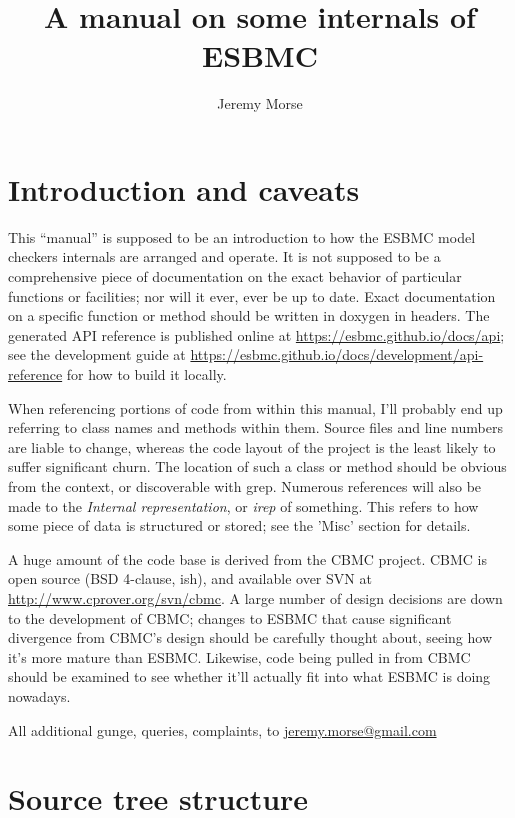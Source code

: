 \documentclass{article}
\newcommand{\subtitle}[1]{%
  \posttitle{%
    \par\end{center}
    \begin{center}\large#1\end{center}
    \vskip0.5em}%
}
\begin{document}
\author{Jeremy Morse}
\title{A manual on some internals of ESBMC}
\subtitle{Caveat lector}
\maketitle
\tableofcontents
\section{Introduction and caveats}

This ``manual'' is supposed to be an introduction to how the ESBMC model
checkers internals are arranged and operate. It is not supposed to be a
comprehensive piece of documentation on the exact behavior of particular
functions or facilities; nor will it ever, ever be up to date. Exact
documentation on a specific function or method should be written in
doxygen in headers. The generated API reference is published online at
\url{https://esbmc.github.io/docs/api}; see the development guide at
\url{https://esbmc.github.io/docs/development/api-reference} for how to build
it locally.

When referencing portions of code from within this manual, I'll probably
end up referring to class names and methods within them. Source files and
line numbers are liable to change, whereas the code layout of the project
is the least likely to suffer significant churn. The location of such a
class or method should be obvious from the context, or discoverable with
grep. Numerous references will also be made to the \textit{Internal
representation}, or \textit{irep} of something. This refers to how some piece
of data is structured or stored; see the 'Misc' section for details.

A huge amount of the code base is derived from the CBMC project. CBMC is
open source (BSD 4-clause, ish), and available over SVN at
\url{http://www.cprover.org/svn/cbmc}. A large number of design decisions
are down to the development of CBMC; changes to ESBMC that cause
significant divergence from CBMC's design should be carefully thought
about, seeing how it's more mature than ESBMC. Likewise, code being
pulled in from CBMC should be examined to see whether it'll actually fit
into what ESBMC is doing nowadays.

All additional gunge, queries, complaints, to \url{jeremy.morse@gmail.com}

\section{Source tree structure}
\end{document}
